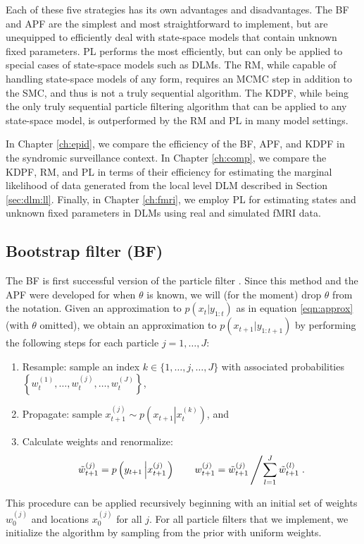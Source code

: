 Each of these five strategies has its own advantages and disadvantages. The BF and APF are the simplest and most straightforward to implement, but are unequipped to efficiently deal with state-space models that contain unknown fixed parameters. PL performs the most efficiently, but can only be applied to special cases of state-space models such as DLMs. The RM, while capable of handling state-space models of any form, requires an MCMC step in addition to the SMC, and thus is not a truly sequential algorithm. The KDPF, while being the only truly sequential particle filtering algorithm that can be applied to any state-space model, is outperformed by the RM and PL in many model settings.

In Chapter \ref{ch:epid}, we compare the efficiency of the BF, APF, and KDPF in the syndromic surveillance context. In Chapter \ref{ch:comp}, we compare the KDPF, RM, and PL in terms of their efficiency for estimating the marginal likelihood of data generated from the local level DLM described in Section \ref{sec:dlm:ll}. Finally, in Chapter \ref{ch:fmri}, we employ PL for estimating states and unknown fixed parameters in DLMs using real and simulated fMRI data.

\subsection{Bootstrap filter (BF) \label{sec:bf}}

The BF is first successful version of the particle filter \citep{Gord:Salm:Smit:nove:1993,Kita:mont:1996}. Since this method and the APF were developed for when $\theta$ is known, we will (for the moment) drop $\theta$ from the notation. Given an approximation to $p(x_t|y_{1:t})$ as in equation \eqref{eqn:approx} (with $\theta$ omitted), we obtain an approximation to $p(x_{t+1}|y_{1:t+1})$ by performing the following steps for each particle $j=1,\ldots,J$:
\begin{enumerate}
\item Resample: sample an index $k\in\{1,\ldots,j,\ldots,J\}$ with associated probabilities $\left\{w_t^{(1)},\ldots,w_t^{(j)},\ldots,w_t^{(J)}\right\}$,
\item Propagate: sample $x_{t+1}^{(j)} \sim p\left( x_{t+1}\left|x_t^{(k)}\right.\right)$, and
\item Calculate weights and renormalize:
\[ \tilde{w}_{t+1}^{(j)} = p\left(y_{t+1}\left|x_{t+1}^{(j)}\right.\right) \qquad w_{t+1}^{(j)} = \tilde{w}_{t+1}^{(j)}\left/ \sum_{l=1}^J \tilde{w}_{t+1}^{(l)} \right. .\]
\end{enumerate}
This procedure can be applied recursively beginning with an initial set of weights $w_0^{(j)}$ and locations $x_0^{(j)}$ for all $j$. For all particle filters that we implement, we initialize the algorithm by sampling from the prior with uniform weights.

